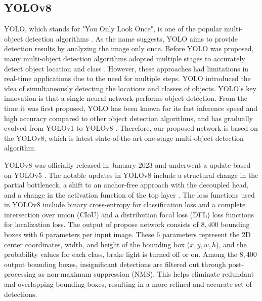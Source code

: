 \subsection{YOLOv8}
YOLO, which stands for "You Only Look Once", is one of the popular multi-object detection algorithms \cite{redmon2016you}.
As the name suggests, YOLO aims to provide detection results by analyzing the image only once. 
Before YOLO was proposed, many multi-object detection algorithms adopted multiple stages to accurately detect object location and class \cite{girshick2014rich, he2015spatial, girshick2015fast, ren2015faster}.
However, these approaches had limitations in real-time applications due to the need for multiple steps.
YOLO introduced the idea of simultaneously detecting the locations and classes of objects.
YOLO's key innovation is that a single neural network performs object detection.
From the time it was first proposed, YOLO has been known for its fast inference speed and high accuracy compared to other object detection algorithms, and has gradually evolved from YOLOv1 to YOLOv8 \cite{redmon2016you, redmon2017yolo9000, redmon2018yolov3, bochkovskiy2020yolov4, YOLOv5, li2022yolov6, wang2023yolov7, YOLOv8}.
Therefore, our proposed network is based on the YOLOv8, which is latest state-of-the-art one-stage multi-object detection algorithm.

YOLOv8 \cite{YOLOv8} was officially released in January 2023 and underwent a update based on YOLOv5 \cite{YOLOv5}.
The notable updates in YOLOv8 include a structural change in the partial bottleneck, a shift to an anchor-free approach with the decoupled head, and a change in the activation function of the top layer \cite{terven2023comprehensive}.
The loss functions used in YOLOv8 include binary cross-entropy for classification loss and a complete intersection over union (CIoU) \cite{zheng2020distance} and a distribution focal loss (DFL) \cite{li2020generalized} loss functions for localization loss.
The output of propose network consists of $8,400$ bounding boxes with $6$ parameters per input image.
These $6$ parameters represent the 2D center coordinates, width, and height of the bounding box ($x, y, w, h$), and the probability values for each class, brake light is turned off or on. 
Among the $8,400$ output bounding boxes, insignificant detections are filtered out through post-processing as non-maximum suppression (NMS).
This helps eliminate redundant and overlapping bounding boxes, resulting in a more refined and accurate set of detections.



